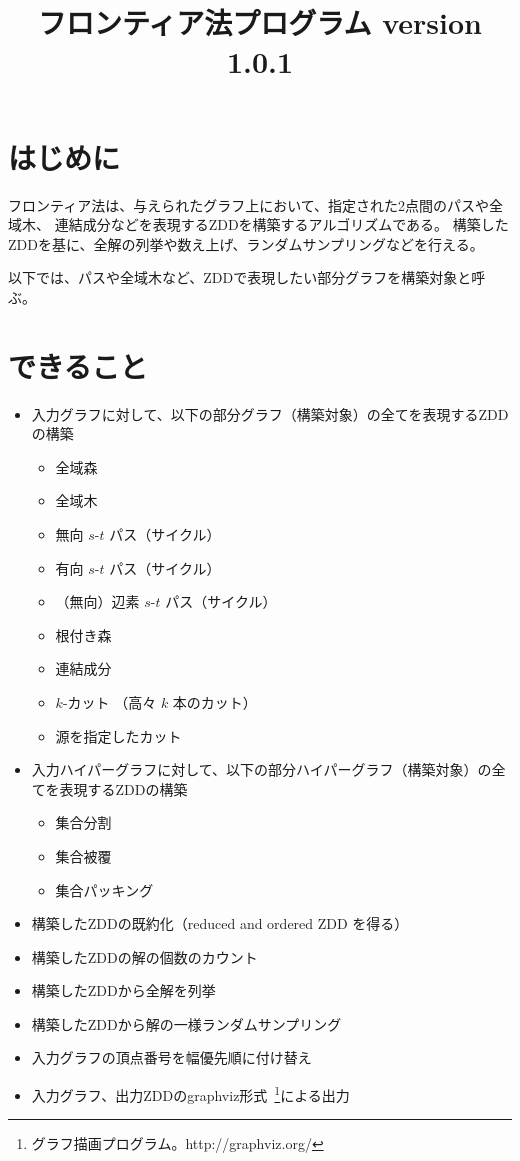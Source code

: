 \documentclass{jsarticle}
\title{フロンティア法プログラム version 1.0.1}
\begin{document}
\maketitle

\section{はじめに}

フロンティア法は、与えられたグラフ上において、指定された2点間のパスや全域木、
連結成分などを表現するZDDを構築するアルゴリズムである。
構築したZDDを基に、全解の列挙や数え上げ、ランダムサンプリングなどを行える。

以下では、パスや全域木など、ZDDで表現したい部分グラフを構築対象と呼ぶ。

\section{できること}

\begin{itemize}
\item 入力グラフに対して、以下の部分グラフ（構築対象）の全てを表現するZDDの構築
\begin{itemize}
\item 全域森
\item 全域木
\item 無向 $s$-$t$ パス（サイクル）
\item 有向 $s$-$t$ パス（サイクル）
\item （無向）辺素 $s$-$t$ パス（サイクル）
\item 根付き森
\item 連結成分
\item $k$-カット （高々 $k$ 本のカット）
\item 源を指定したカット
\end{itemize}
\item 入力ハイパーグラフに対して、以下の部分ハイパーグラフ（構築対象）の全てを表現するZDDの構築
\begin{itemize}
\item 集合分割
\item 集合被覆
\item 集合パッキング
\end{itemize}
\item 構築したZDDの既約化（reduced and ordered ZDD を得る）
\item 構築したZDDの解の個数のカウント
\item 構築したZDDから全解を列挙
\item 構築したZDDから解の一様ランダムサンプリング
\item 入力グラフの頂点番号を幅優先順に付け替え
\item 入力グラフ、出力ZDDのgraphviz形式~\footnote{グラフ描画プログラム。http://graphviz.org/}による出力
\end{itemize}
\end{document}
